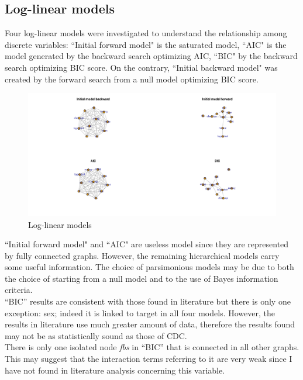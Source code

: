 \documentclass{article}
\begin{document}
\subsection{Log-linear models}
Four log-linear models were investigated to understand the relationship among discrete variables: ``Initial forward model" is the saturated model, ``AIC" is the model generated by the backward search optimizing AIC, ``BIC" by the backward search optimizing BIC score. On the contrary, ``Initial backward model" was created by the forward search from a null model optimizing BIC score.
\begin{figure}[H]
       \centering
       \includegraphics[width=1\textwidth]{Log-linear discrete results.pdf}
       \caption{Log-linear models}
\end{figure}
``Initial forward model" and ``AIC" are useless model since they are represented by fully connected graphs. However, the remaining hierarchical models carry some useful information.
The choice of parsimonious models may be due to both the choice of starting from a null model and to the use of Bayes information criteria. \\

``BIC'' results are consistent with those found in literature but there is only one exception: sex; indeed it is linked to target in all four models. However, the results in literature use much greater amount of  data, therefore the results found may not be as statistically sound as those of CDC.\\
There is only one isolated node \textit{fbs} in ``BIC'' that is connected in all other graphs. This may suggest that the interaction terms referring to it are very weak since I have not found in literature analysis concerning this variable. \\
\end{document}
